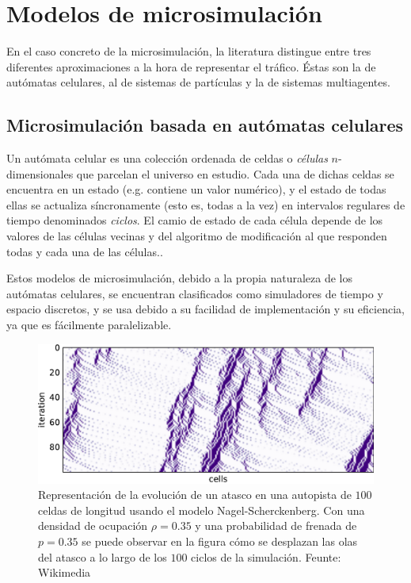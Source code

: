 \section{Modelos de microsimulación}

En el caso concreto de la microsimulación, la literatura distingue entre tres diferentes aproximaciones a la hora de representar el tráfico. Éstas son la de autómatas celulares, al de sistemas de partículas y la de sistemas multiagentes.

\subsection{Microsimulación basada en autómatas celulares}

Un autómata celular es una colección ordenada de celdas o \textit{células} $n$-dimensionales que parcelan el universo en estudio. Cada una de dichas celdas se encuentra en un estado (e.g. contiene un valor numérico), y el estado de todas ellas se actualiza síncronamente (esto es, todas a la vez) en intervalos regulares de tiempo denominados \textit{ciclos}. El camio de estado de cada célula depende de los valores de las células vecinas y del algoritmo de modificación al que responden todas y cada una de las células..

Estos modelos de microsimulación, debido a la propia naturaleza de los autómatas celulares, se encuentran clasificados como simuladores de tiempo y espacio discretos, y se usa debido a su facilidad de implementación y su eficiencia, ya que es fácilmente paralelizable.


\begin{figure}
	\centering
	\includegraphics[width=.75\linewidth]{images/nagel-schreck}
	\caption{Representación de la evolución de un atasco en una autopista  de $100$ celdas de longitud usando el modelo Nagel-Scherckenberg. Con una densidad de ocupación $\rho = 0.35$ y una probabilidad de frenada de $p = 0.35$ se puede observar en la figura cómo se desplazan las olas del atasco a lo largo de los $100$ ciclos de la simulación. Feunte: Wikimedia}
	\label{fig:nagel-schreck}
\end{figure}

